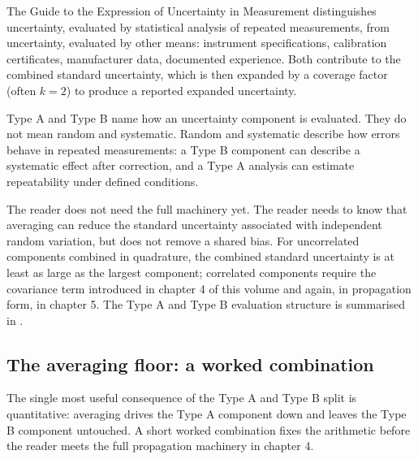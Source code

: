 The Guide to the Expression of Uncertainty in Measurement
\cite{std:iso-iec-guide98} distinguishes  uncertainty,
evaluated by statistical analysis of repeated measurements, from
 uncertainty, evaluated by other means: instrument
specifications, calibration certificates, manufacturer data,
documented experience. Both contribute to the combined standard
uncertainty, which is then expanded by a coverage factor (often
$k = 2$) to produce a reported expanded uncertainty.

Type A and Type B name how an uncertainty component is evaluated.
They do not mean random and systematic. Random and systematic
describe how errors behave in repeated measurements: a Type B
component can describe a systematic effect after correction, and a
Type A analysis can estimate repeatability under defined conditions.

The reader does not need the full machinery yet. The reader needs to
know that averaging can reduce the standard uncertainty associated
with independent random variation, but does not remove a shared bias.
For uncorrelated components combined in quadrature, the combined
standard uncertainty is at least as large as the largest component;
correlated components require the covariance term introduced in
chapter 4 of this volume and again, in propagation form, in chapter 5.
The Type A and Type B evaluation structure is summarised in
.



\subsection{The averaging floor: a worked combination}

The single most useful consequence of the Type A and Type B split is
quantitative: averaging drives the Type A component down and leaves
the Type B component untouched. A short worked combination fixes the
arithmetic before the reader meets the full propagation machinery in
chapter 4.

